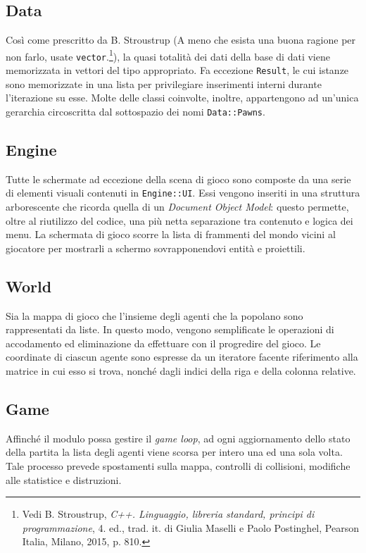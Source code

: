 \documentclass[a4paper]{article}
\begin{document}
\subsection{Data}

Così come prescritto da B. Stroustrup (\guillemotleft A meno che esista una buona ragione per
non farlo, usate \verb!vector!.\guillemotright\footnote{\label{note1} Vedi B.
Stroustrup, \emph{C++. Linguaggio, libreria standard, principi di
programmazione}, 4. ed., trad. it. di Giulia Maselli e Paolo Postinghel, Pearson
Italia, Milano, 2015, p. 810.}), la quasi totalità dei dati della base di
dati viene memorizzata in vettori del tipo appropriato. Fa eccezione
\verb!Result!, le cui istanze sono memorizzate in una lista per privilegiare
inserimenti interni durante l'iterazione su esse. Molte delle classi coinvolte,
inoltre, appartengono ad un'unica gerarchia circoscritta dal sottospazio dei
nomi \verb!Data::Pawns!.

\subsection{Engine}

Tutte le schermate ad eccezione della scena di gioco sono composte da una serie
di elementi visuali contenuti in \verb!Engine::UI!. Essi vengono inseriti in una
struttura arborescente che ricorda quella di un \emph{Document Object Model}:
questo permette, oltre al riutilizzo del codice, una più netta separazione tra
contenuto e logica dei menu.
La schermata di gioco scorre la lista di frammenti del mondo vicini al giocatore
per mostrarli a schermo sovrapponendovi entit\`a e proiettili.

\subsection{World}

Sia la mappa di gioco che l'insieme degli agenti che la popolano sono
rappresentati da liste. In questo modo, vengono semplificate le operazioni di
accodamento ed eliminazione da effettuare con il progredire del gioco. Le
coordinate di ciascun agente sono espresse da un iteratore facente riferimento
alla matrice in cui esso si trova, nonch\'e dagli indici della riga e della
colonna relative.

\subsection{Game}

Affinch\'e il modulo possa gestire il \emph{game loop}, ad ogni aggiornamento
dello stato della partita la lista degli agenti viene scorsa per intero una ed
una sola volta. Tale processo prevede spostamenti sulla mappa, controlli di
collisioni, modifiche alle statistice e distruzioni.
\end{document}
